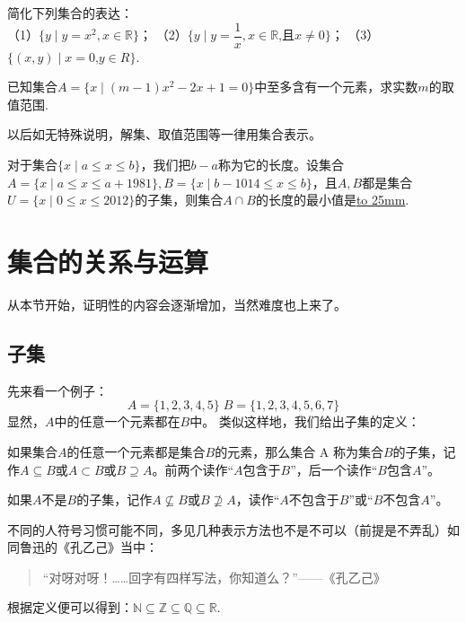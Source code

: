 \documentclass[lang=cn,math=cm,chinesefont=nofont,11pt,scheme=chinese,twocol]{elegantbook}
\begin{document}
\begin{exercise}\label{exer:8}
  简化下列集合的表达：\\
  （1）$\{y\mid y=x^2,x\in\mathbb{R}\}$；
  （2）$\{y\mid y=\dfrac{1}{x},x\in\mathbb{R}\text{,且}x\neq0\}$；
  （3）$\{(x,y)\mid x=0\text{,}y\in R\}$.
\end{exercise}

\begin{exercise}\label{exer:9}
  已知集合$A=\{x\mid(m-1)x^2-2x+1=0\}$中至多含有一个元素，求实数$m$的取值范围.
\end{exercise}
\begin{remark}
  以后如无特殊说明，解集、取值范围等一律用集合表示。
\end{remark}

\begin{exercise}\label{exer:202406261951}
  对于集合$\{x\mid a\leq x\leq b\}$，我们把$b-a$称为它的长度。设集合$A=\{x\mid a\leq x\leq a+1981\},B=\{x\mid b-1014\leq x\leq b\}$，且$A,B$都是集合$U=\{x\mid 0\leq x\leq 2012\}$的子集，则集合$A\cap B$的长度的最小值是\underline{\hbox to 25mm{}}.
\end{exercise}

\section{集合的关系与运算}
从本节开始，证明性的内容会逐渐增加，当然难度也上来了。
\subsection{子集}
先来看一个例子：$$A=\{1,2,3,4,5\}\;B=\{1,2,3,4,5,6,7\}$$
显然，$A$中的任意一个元素都在$B$中。
类似这样地，我们给出子集的定义：
\begin{definition}[子集]
  如果集合$A$的任意一个元素都是集合$B$的元素，那么集合 A 称为集合$B$的子集，记作$A\subseteq B$或$A\subset B$或$B\supseteq A$。前两个读作“$A$包含于$B$”，后一个读作“$B$包含$A$”。

  如果$A$不是$B$的子集，记作$A\nsubseteq B$或$B\nsupseteq A$，读作“$A$不包含于$B$”或“$B$不包含$A$”。
\end{definition}
不同的人符号习惯可能不同，多见几种表示方法也不是不可以（前提是不弄乱）如同鲁迅的《孔乙己》当中：
\begin{quotation}
  “对呀对呀！……回字有四样写法，你知道么？”——《孔乙己》
\end{quotation}

根据定义便可以得到：$\mathbb{N}\subseteq\mathbb{Z}\subseteq\mathbb{Q}\subseteq\mathbb{R}$.
\end{document}
